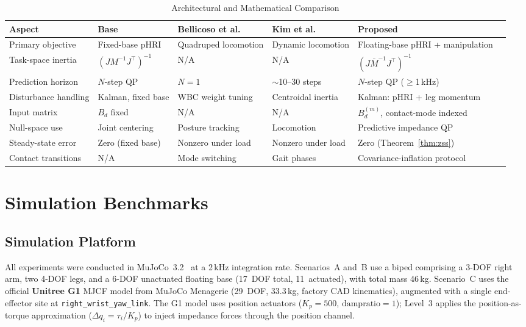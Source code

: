 \documentclass[journal]{IEEEtran}
\newcommand{\Mbar}{\bar{M}^{-1}}
\begin{document}
\begin{table}[!t]
\caption{Architectural and Mathematical Comparison}
\label{tab:comparison}
\renewcommand{\arraystretch}{1.3}
\begin{tabular*}{\textwidth}{@{\extracolsep{\fill}}llllll}
\toprule
\textbf{Aspect} & \textbf{Base \cite{cao2026impedance}} & \textbf{Bellicoso et al.\ \cite{bellicoso2016perception}} & \textbf{Kim et al.\ \cite{kim2019highly}} & \textbf{Proposed} \\
\midrule
Primary objective    & Fixed-base pHRI           & Quadruped locomotion  & Dynamic locomotion    & Floating-base pHRI + manipulation \\
Task-space inertia   & $(JM^{-1}J^\top)^{-1}$   & N/A                   & N/A                   & $(J\Mbar J^\top)^{-1}$ \\
Prediction horizon   & $N$-step QP               & $N=1$                 & $\sim$10--30 steps    & $N$-step QP (${\geq}$1\,kHz) \\
Disturbance handling & Kalman, fixed base        & WBC weight tuning     & Centroidal inertia    & Kalman: pHRI + leg momentum \\
Input matrix         & $B_d$ fixed               & N/A                   & N/A                   & $B_d^{(m)}$, contact-mode indexed \\
Null-space use       & Joint centering           & Posture tracking      & Locomotion            & Predictive impedance QP \\
Steady-state error   & Zero (fixed base)         & Nonzero under load    & Nonzero under load    & Zero (Theorem~\ref{thm:zss}) \\
Contact transitions  & N/A                       & Mode switching        & Gait phases           & Covariance-inflation protocol \\
\bottomrule
\end{tabular*}
\end{table}

\section{Simulation Benchmarks}\label{sec:simulation}

\subsection{Simulation Platform}

All experiments were conducted in MuJoCo~3.2~\cite{todorov2012mujoco} at a
2\,kHz integration rate.
Scenarios~A and~B use a biped comprising a 3-DOF right arm, two 4-DOF legs,
and a 6-DOF unactuated floating base (17~DOF total, 11~actuated), with
total mass 46\,kg.
Scenario~C uses the official \textbf{Unitree G1} MJCF model from MuJoCo
Menagerie (29~DOF, 33.3\,kg, factory CAD kinematics), augmented with a
single end-effector site at \texttt{right\_wrist\_yaw\_link}.
The G1 model uses position actuators ($K_p=500$, $\text{dampratio}=1$);
Level~3 applies the position-as-torque approximation
($\Delta q_i=\tau_i/K_p$) to inject impedance forces through the position
channel.
\end{document}
